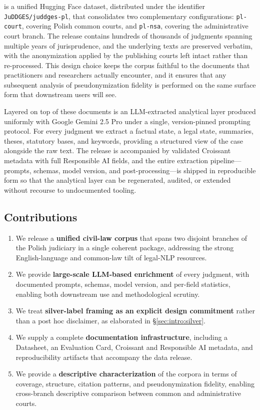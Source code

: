 \juddgespl{} is a unified Hugging Face dataset, distributed under the identifier \texttt{JuDDGES/juddges-pl}, that consolidates two complementary configurations: \texttt{pl-court}, covering Polish common courts, and \texttt{pl-nsa}, covering the administrative court branch. The release contains hundreds of thousands of judgments spanning multiple years of jurisprudence, and the underlying texts are preserved verbatim, with the anonymization applied by the publishing courts left intact rather than re-processed. This design choice keeps the corpus faithful to the documents that practitioners and researchers actually encounter, and it ensures that any subsequent analysis of pseudonymization fidelity is performed on the same surface form that downstream users will see.

Layered on top of these documents is an LLM-extracted analytical layer produced uniformly with Google Gemini 2.5 Pro under a single, version-pinned prompting protocol. For every judgment we extract a factual state, a legal state, summaries, theses, statutory bases, and keywords, providing a structured view of the case alongside the raw text. The release is accompanied by validated Croissant metadata with full Responsible AI fields, and the entire extraction pipeline---prompts, schemas, model version, and post-processing---is shipped in reproducible form so that the analytical layer can be regenerated, audited, or extended without recourse to undocumented tooling.

\subsection{Contributions}
\label{sec:intro:contributions}

\begin{enumerate}
  \item We release a \textbf{unified civil-law corpus} that spans two disjoint branches of the Polish judiciary in a single coherent package, addressing the strong English-language and common-law tilt of legal-NLP resources.
  \item We provide \textbf{large-scale LLM-based enrichment} of every judgment, with documented prompts, schemas, model version, and per-field statistics, enabling both downstream use and methodological scrutiny.
  \item We treat \textbf{silver-label framing as an explicit design commitment} rather than a post hoc disclaimer, as elaborated in \S\ref{sec:intro:silver}.
  \item We supply a complete \textbf{documentation infrastructure}, including a Datasheet, an Evaluation Card, Croissant and Responsible AI metadata, and reproducibility artifacts that accompany the data release.
  \item We provide a \textbf{descriptive characterization} of the corpora in terms of coverage, structure, citation patterns, and pseudonymization fidelity, enabling cross-branch descriptive comparison between common and administrative courts.
\end{enumerate}

